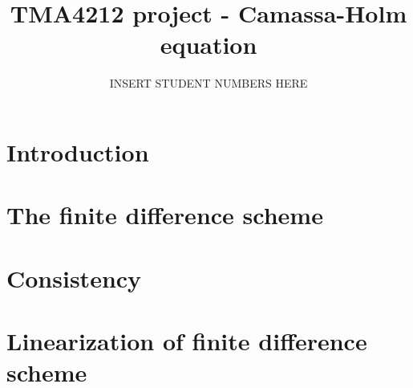 \documentclass{article}
\title{TMA4212 project - Camassa-Holm equation}
\author{INSERT STUDENT NUMBERS HERE}
\begin{document}
\maketitle

\newpage

\section*{Introduction}


\newpage

\section*{The finite difference scheme}


\newpage

\section*{Consistency}


\newpage


\section*{Linearization of finite difference scheme}

\end{document}
